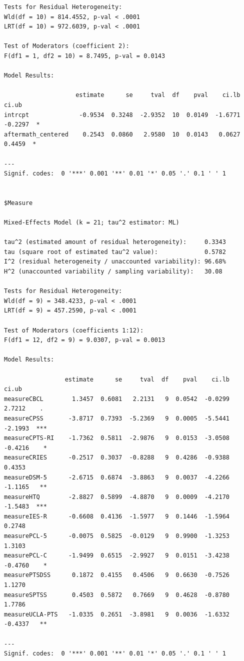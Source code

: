 \documentclass[
  letterpaper,
  DIV=11,
  numbers=noendperiod]{scrartcl}
\begin{document}
\begin{verbatim}
Tests for Residual Heterogeneity:
Wld(df = 10) = 814.4552, p-val < .0001
LRT(df = 10) = 972.6039, p-val < .0001

Test of Moderators (coefficient 2):
F(df1 = 1, df2 = 10) = 8.7495, p-val = 0.0143

Model Results:

                    estimate      se     tval  df    pval    ci.lb    ci.ub    
intrcpt              -0.9534  0.3248  -2.9352  10  0.0149  -1.6771  -0.2297  * 
aftermath_centered    0.2543  0.0860   2.9580  10  0.0143   0.0627   0.4459  * 

---
Signif. codes:  0 '***' 0.001 '**' 0.01 '*' 0.05 '.' 0.1 ' ' 1


$Measure

Mixed-Effects Model (k = 21; tau^2 estimator: ML)

tau^2 (estimated amount of residual heterogeneity):     0.3343
tau (square root of estimated tau^2 value):             0.5782
I^2 (residual heterogeneity / unaccounted variability): 96.68%
H^2 (unaccounted variability / sampling variability):   30.08

Tests for Residual Heterogeneity:
Wld(df = 9) = 348.4233, p-val < .0001
LRT(df = 9) = 457.2590, p-val < .0001

Test of Moderators (coefficients 1:12):
F(df1 = 12, df2 = 9) = 9.0307, p-val = 0.0013

Model Results:

                 estimate      se     tval  df    pval    ci.lb    ci.ub      
measureCBCL        1.3457  0.6081   2.2131   9  0.0542  -0.0299   2.7212    . 
measureCPSS       -3.8717  0.7393  -5.2369   9  0.0005  -5.5441  -2.1993  *** 
measureCPTS-RI    -1.7362  0.5811  -2.9876   9  0.0153  -3.0508  -0.4216    * 
measureCRIES      -0.2517  0.3037  -0.8288   9  0.4286  -0.9388   0.4353      
measureDSM-5      -2.6715  0.6874  -3.8863   9  0.0037  -4.2266  -1.1165   ** 
measureHTQ        -2.8827  0.5899  -4.8870   9  0.0009  -4.2170  -1.5483  *** 
measureIES-R      -0.6608  0.4136  -1.5977   9  0.1446  -1.5964   0.2748      
measurePCL-5      -0.0075  0.5825  -0.0129   9  0.9900  -1.3253   1.3103      
measurePCL-C      -1.9499  0.6515  -2.9927   9  0.0151  -3.4238  -0.4760    * 
measurePTSDSS      0.1872  0.4155   0.4506   9  0.6630  -0.7526   1.1270      
measureSPTSS       0.4503  0.5872   0.7669   9  0.4628  -0.8780   1.7786      
measureUCLA-PTS   -1.0335  0.2651  -3.8981   9  0.0036  -1.6332  -0.4337   ** 

---
Signif. codes:  0 '***' 0.001 '**' 0.01 '*' 0.05 '.' 0.1 ' ' 1



\end{verbatim}
\end{document}
